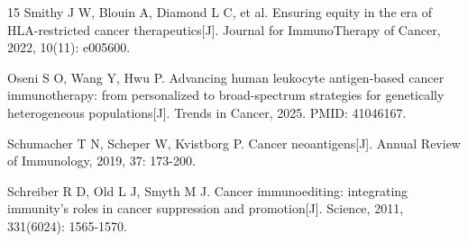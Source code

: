 \documentclass[12pt,a4paper]{ctexart}
\begin{document}
\begin{thebibliography}{15}
 Smithy J W, Blouin A, Diamond L C, et al. Ensuring equity in the era of HLA-restricted cancer therapeutics[J]. Journal for ImmunoTherapy of Cancer, 2022, 10(11): e005600.

 Oseni S O, Wang Y, Hwu P. Advancing human leukocyte antigen-based cancer immunotherapy: from personalized to broad-spectrum strategies for genetically heterogeneous populations[J]. Trends in Cancer, 2025. PMID: 41046167.

 Schumacher T N, Scheper W, Kvistborg P. Cancer neoantigens[J]. Annual Review of Immunology, 2019, 37: 173-200.

 Schreiber R D, Old L J, Smyth M J. Cancer immunoediting: integrating immunity's roles in cancer suppression and promotion[J]. Science, 2011, 331(6024): 1565-1570.

\end{thebibliography}
\end{document}
